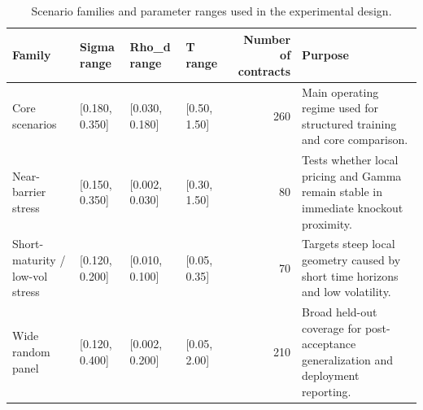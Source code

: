 \begin{table}
\caption{Scenario families and parameter ranges used in the experimental design.}
\label{tab:scenario_families}
\begin{tabular}{llllrl}
\toprule
Family & Sigma range & Rho_d range & T range & Number of contracts & Purpose \\
\midrule
Core scenarios & [0.180, 0.350] & [0.030, 0.180] & [0.50, 1.50] & 260 & Main operating regime used for structured training and core comparison. \\
Near-barrier stress & [0.150, 0.350] & [0.002, 0.030] & [0.30, 1.50] & 80 & Tests whether local pricing and Gamma remain stable in immediate knockout proximity. \\
Short-maturity / low-vol stress & [0.120, 0.200] & [0.010, 0.100] & [0.05, 0.35] & 70 & Targets steep local geometry caused by short time horizons and low volatility. \\
Wide random panel & [0.120, 0.400] & [0.002, 0.200] & [0.05, 2.00] & 210 & Broad held-out coverage for post-acceptance generalization and deployment reporting. \\
\bottomrule
\end{tabular}
\end{table}
